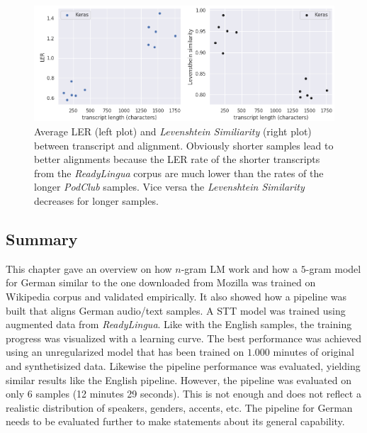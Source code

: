\begin{figure}[h!]
	\includegraphics[width=\linewidth]{./img/scatterplot_rl.png}
	\caption{Average \ac{LER} (left plot) and \textit{Levenshtein Similiarity} (right plot) between transcript and alignment. Obviously shorter samples lead to better alignments because the \ac{LER} rate of the shorter transcripts from the \textit{ReadyLingua} corpus are much lower than the rates of the longer \textit{PodClub} samples. Vice versa the \textit{Levenshtein Similarity} decreases for longer samples.}
	\label{pipeline_scatterplot_rl_de}
\end{figure}

\subsection{Summary}

This chapter gave an overview on how $n$-gram \ac{LM} work and how a $5$-gram model for German similar to the one downloaded from Mozilla was trained on Wikipedia corpus and validated empirically. It also showed how a pipeline was built that aligns German audio/text samples. A \ac{STT} model was trained using augmented data from \textit{ReadyLingua}. Like with the English samples, the training progress was visualized with a learning curve. The best performance was achieved using an unregularized model that has been trained on $1.000$ minutes of original and synthetisized data. Likewise the pipeline performance was evaluated, yielding similar results like the English pipeline. However, the pipeline was evaluated on only 6 samples (12 minutes 29 seconds). This is not enough and does not reflect a realistic distribution of speakers, genders, accents, etc. The pipeline for German needs to be evaluated further to make statements about its general capability.